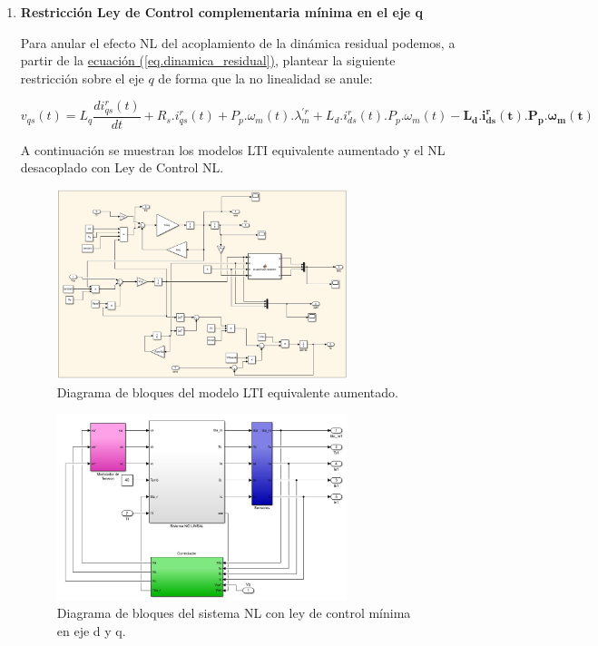 \documentclass{article}
\begin{document}
\begin{enumerate}[label=\roman*.]
    \item \textbf{Restricción Ley de Control complementaria mínima en el eje q}
    
    Para anular el efecto NL del acoplamiento de la dinámica residual podemos, a partir de la
    \hyperref[eq.dinamica_residual]{ecuación (\ref*{eq.dinamica_residual})},
    plantear la siguiente restricción sobre el eje $q$ de forma que la no linealidad se anule:

    \begin{equation}
        v_{qs}(t) = L_{q}\frac{di_{qs}^r(t)}{dt} + R_{s}.i_{qs}^r(t) + P_{p}.\omega_{m}(t).\lambda_{m}^{\prime r} + L_{d}.i_{ds}^r(t).P_{p}.\omega_{m}(t) - \mathbf{L_{d}.i_{ds}^r(t).P_{p}.\omega_{m}(t)}
    \end{equation}


    A continuación se muestran los modelos LTI equivalente aumentado y el NL desacoplado con Ley de Control NL.

    \begin{figure}[H]
        \centering
        \includegraphics[width=0.8\textwidth]{LTI_aumentado1.png}
        \caption{Diagrama de bloques del modelo LTI equivalente aumentado.}
    \end{figure}

    \begin{figure}[H]
        \centering
        \includegraphics[width=0.8\textwidth]{LTI_AUMENTADO_Q.jpg}
        \caption{Diagrama de bloques del sistema NL con ley de control mínima en eje d y q.}
    \end{figure}


\end{enumerate}
\end{document}

